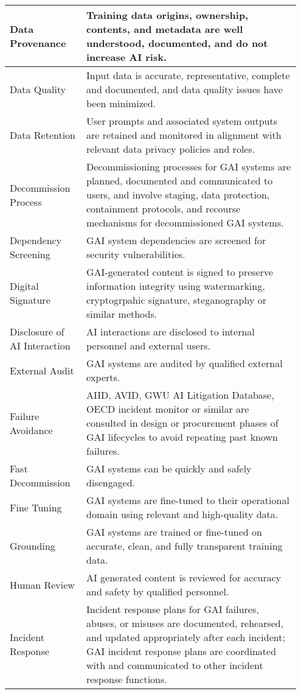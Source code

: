 \documentclass[fleqn]{article}
\begin{document}
\begin{table}[H]
\begin{tabular}{|m{0.25\linewidth} |m{0.70\linewidth} |}
		Data Provenance & Training data origins, ownership, contents, and metadata are well understood, documented, and do not increase AI risk.  \\ \hline
		Data Quality & Input data is accurate, representative, complete and documented, and data quality issues have been minimized.  \\ \hline
		Data Retention & User prompts and associated system outputs are retained and monitored in alignment with relevant data privacy policies and roles.   \\ \hline
		Decommission Process & Decommissioning processes for GAI systems are planned, documented and communicated to users, and involve staging, data protection, containment protocols, and recourse mechanisms for decommissioned GAI systems.   \\ \hline
		Dependency Screening  & GAI system dependencies are screened for security vulnerabilities.  \\ \hline
		Digital Signature & GAI-generated content is signed to preserve information integrity using watermarking, cryptogrpahic signature, steganography or similar methods.  \\ \hline
		Disclosure of AI Interaction & AI interactions are disclosed to internal personnel and external users. \\ \hline
		External Audit & GAI systems are audited by qualified external experts.  \\ \hline
		Failure Avoidance & AIID, AVID, GWU AI Litigation Database, OECD incident monitor or similar are consulted in design or procurement phases of GAI lifecycles to avoid repeating past known failures.  \\ \hline
		Fast Decommission & GAI systems can be quickly and safely disengaged.  \\ \hline		
		Fine Tuning & GAI systems are fine-tuned to their operational domain using relevant and high-quality data.  \\ \hline
		Grounding & GAI systems are trained or fine-tuned on accurate, clean, and fully transparent training data.  \\ \hline
		Human Review  & AI generated content is reviewed for accuracy and safety by qualified personnel.  \\ \hline
		Incident Response & Incident response plans for GAI failures, abuses, or misuses are documented, rehearsed, and updated appropriately after each incident; GAI incident response plans are coordinated with and communicated to other incident response functions.  \\ \hline

\end{tabular}
\end{table}
\end{document}
